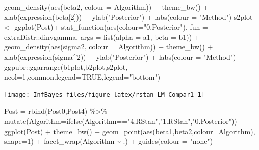 \documentclass[
]{book}
\newenvironment{Shaded}{\begin{snugshade}}{\end{snugshade}}
\newcommand{\AttributeTok}[1]{\textcolor[rgb]{0.77,0.63,0.00}{#1}}
\newcommand{\ConstantTok}[1]{\textcolor[rgb]{0.00,0.00,0.00}{#1}}
\newcommand{\DecValTok}[1]{\textcolor[rgb]{0.00,0.00,0.81}{#1}}
\newcommand{\FunctionTok}[1]{\textcolor[rgb]{0.00,0.00,0.00}{#1}}
\newcommand{\NormalTok}[1]{#1}
\newcommand{\OtherTok}[1]{\textcolor[rgb]{0.56,0.35,0.01}{#1}}
\newcommand{\SpecialCharTok}[1]{\textcolor[rgb]{0.00,0.00,0.00}{#1}}
\newcommand{\StringTok}[1]{\textcolor[rgb]{0.31,0.60,0.02}{#1}}
\begin{document}
\begin{Shaded}
\begin{Highlighting}[]
  \FunctionTok{geom\_density}\NormalTok{(}\FunctionTok{aes}\NormalTok{(beta2, }\AttributeTok{colour =}\NormalTok{ Algorithm)) }\SpecialCharTok{+} \FunctionTok{theme\_bw}\NormalTok{() }\SpecialCharTok{+}
  \FunctionTok{xlab}\NormalTok{(}\FunctionTok{expression}\NormalTok{(beta[}\DecValTok{2}\NormalTok{])) }\SpecialCharTok{+} \FunctionTok{ylab}\NormalTok{(}\StringTok{"Posterior"}\NormalTok{) }\SpecialCharTok{+} \FunctionTok{labs}\NormalTok{(}\AttributeTok{colour =} \StringTok{"Method"}\NormalTok{)}
\NormalTok{s2plot }\OtherTok{\textless{}{-}} \FunctionTok{ggplot}\NormalTok{(Post)}\SpecialCharTok{+}
  \FunctionTok{stat\_function}\NormalTok{(}\FunctionTok{aes}\NormalTok{(}\AttributeTok{colour=}\StringTok{"0.Posterior"}\NormalTok{), }\AttributeTok{fun =}\NormalTok{ extraDistr}\SpecialCharTok{::}\NormalTok{dinvgamma, }\AttributeTok{args =} \FunctionTok{list}\NormalTok{(}\AttributeTok{alpha =}\NormalTok{ a1, }\AttributeTok{beta =}\NormalTok{ b1)) }\SpecialCharTok{+}
  \FunctionTok{geom\_density}\NormalTok{(}\FunctionTok{aes}\NormalTok{(sigma2, }\AttributeTok{colour =}\NormalTok{ Algorithm)) }\SpecialCharTok{+} \FunctionTok{theme\_bw}\NormalTok{() }\SpecialCharTok{+}
  \FunctionTok{xlab}\NormalTok{(}\FunctionTok{expression}\NormalTok{(sigma}\SpecialCharTok{\^{}}\DecValTok{2}\NormalTok{)) }\SpecialCharTok{+} \FunctionTok{ylab}\NormalTok{(}\StringTok{"Posterior"}\NormalTok{) }\SpecialCharTok{+} \FunctionTok{labs}\NormalTok{(}\AttributeTok{colour =} \StringTok{"Method"}\NormalTok{)}
\NormalTok{ggpubr}\SpecialCharTok{::}\FunctionTok{ggarrange}\NormalTok{(b1plot,b2plot,s2plot,}
                  \AttributeTok{ncol=}\DecValTok{1}\NormalTok{,}\AttributeTok{common.legend=}\ConstantTok{TRUE}\NormalTok{,}\AttributeTok{legend=}\StringTok{"bottom"}\NormalTok{)}
\end{Highlighting}
\end{Shaded}

\begin{center}\texttt{[image: InfBayes\_files/figure-latex/rstan\_LM\_Compar1-1]} \end{center}

\begin{Shaded}
\begin{Highlighting}[]
\NormalTok{Post }\OtherTok{=} \FunctionTok{rbind}\NormalTok{(Post0,Post4) }\SpecialCharTok{\%\textgreater{}\%}
  \FunctionTok{mutate}\NormalTok{(}\AttributeTok{Algorithm=}\FunctionTok{ifelse}\NormalTok{(Algorithm}\SpecialCharTok{==}\StringTok{"4.RStan"}\NormalTok{,}\StringTok{"1.RStan"}\NormalTok{,}\StringTok{"0.Posterior"}\NormalTok{))}
\FunctionTok{ggplot}\NormalTok{(Post) }\SpecialCharTok{+} \FunctionTok{theme\_bw}\NormalTok{() }\SpecialCharTok{+}
  \FunctionTok{geom\_point}\NormalTok{(}\FunctionTok{aes}\NormalTok{(beta1,beta2,}\AttributeTok{colour=}\NormalTok{Algorithm), }\AttributeTok{shape=}\DecValTok{1}\NormalTok{) }\SpecialCharTok{+}
  \FunctionTok{facet\_wrap}\NormalTok{(Algorithm }\SpecialCharTok{\textasciitilde{}}\NormalTok{ .) }\SpecialCharTok{+} \FunctionTok{guides}\NormalTok{(}\AttributeTok{colour =} \StringTok{"none"}\NormalTok{)}
\end{Highlighting}
\end{Shaded}
\end{document}
